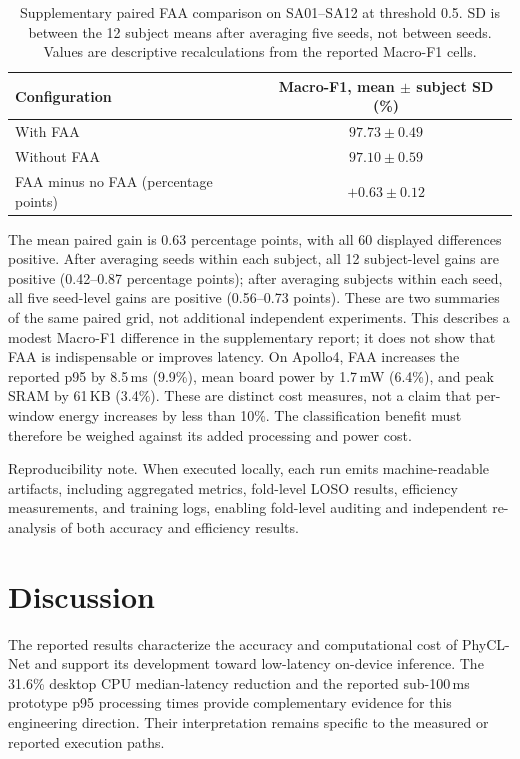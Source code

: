 \documentclass[jec]{acnsart}
\begin{document}
\begin{table}[htbp]
\caption{Supplementary paired FAA comparison on SA01--SA12 at threshold 0.5. SD is between the 12 subject means after averaging five seeds, not between seeds. Values are descriptive recalculations from the reported Macro-F1 cells.}
\label{tab:paired_faa}
\centering\small
\begin{tabular}{lc}
\toprule
Configuration & Macro-F1, mean $\pm$ subject SD (\%) \\
\midrule
With FAA & $97.73\pm0.49$ \\
Without FAA & $97.10\pm0.59$ \\
FAA minus no FAA (percentage points) & $+0.63\pm0.12$ \\
\bottomrule
\end{tabular}
\end{table}

The mean paired gain is 0.63 percentage points, with all 60 displayed differences positive. After averaging seeds within each subject, all 12 subject-level gains are positive (0.42--0.87 percentage points); after averaging subjects within each seed, all five seed-level gains are positive (0.56--0.73 points). These are two summaries of the same paired grid, not additional independent experiments. This describes a modest Macro-F1 difference in the supplementary report; it does not show that FAA is indispensable or improves latency. On Apollo4, FAA increases the reported p95 by 8.5\,ms (9.9\%), mean board power by 1.7\,mW (6.4\%), and peak SRAM by 61\,KB (3.4\%). These are distinct cost measures, not a claim that per-window energy increases by less than 10\%. The classification benefit must therefore be weighed against its added processing and power cost.

\noindent Reproducibility note. When executed locally, each run emits machine-readable artifacts, including aggregated metrics, fold-level LOSO results, efficiency measurements, and training logs, enabling fold-level auditing and independent re-analysis of both accuracy and efficiency results.


\section{Discussion}

The reported results characterize the accuracy and computational cost of PhyCL-Net and support its development toward low-latency on-device inference. The 31.6\% desktop CPU median-latency reduction and the reported sub-100\,ms prototype p95 processing times provide complementary evidence for this engineering direction. Their interpretation remains specific to the measured or reported execution paths.
\end{document}
